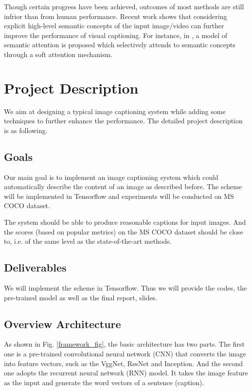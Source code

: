 \documentclass[conference]{IEEEtran}
\begin{document}
Though certain progress have been achieved, outcomes of most methods are still infrior than from human performance. Recent work shows that considering explicit high-level semantic concepts of the input image/video can further improve the performance of visual captioning. For instance, in \cite{you2016image}, a model of semantic attention is proposed which selectively attends to semantic concepts through a soft attention mechanism.



\section{Project Description}
We aim at designing a typical image captioning system while adding some techniques to further enhance the performance. The detailed project description is as following.
\subsection{Goals}
Our main goal is to implement an image captioning system which could automatically describe the content of an image as described before. The scheme will be implemented in Tensorflow and experiments will be conducted on MS COCO dataset.

The system should be able to produce reasonable captions for input images. And the scores (based on popular metrics) on the MS COCO dataset should be close to, i.e. of the same level as the state-of-the-art methods.

\subsection{Deliverables}

We will implement the scheme in Tensorflow. Thus we will provide the codes, the pre-trained model as well as the final report, slides.
\subsection{Overview Architecture}

As shown in Fig. \ref{framework_fig}, the basic architecture has two parts. The first one is a pre-trained convolutional neural network (CNN) that converts the image into feature vectors, such as the VggNet, ResNet and Inception. And the second one adopts the recurrent neural network (RNN) model. It takes the image feature as the input and generate the word vectors of a sentence (caption).
\end{document}
